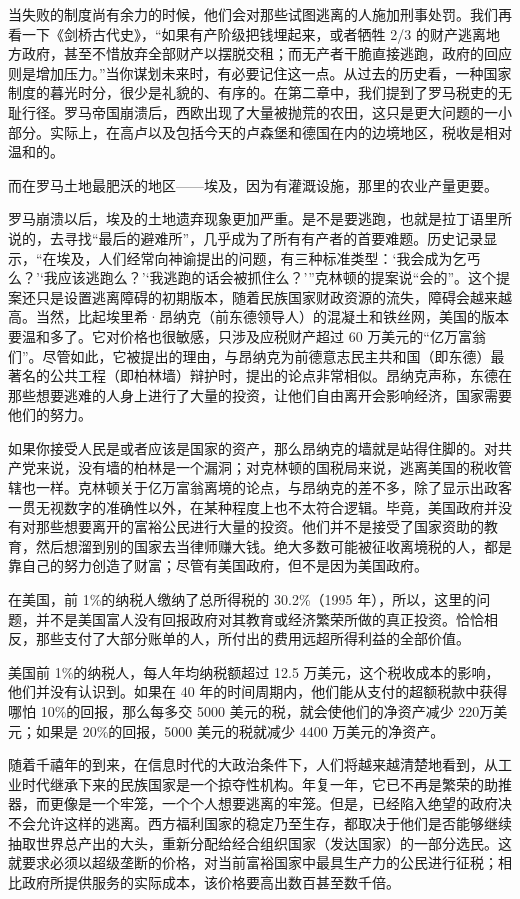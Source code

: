 当失败的制度尚有余力的时候，他们会对那些试图逃离的人施加刑事处罚。我们再看一下《剑桥古代史》，“如果有产阶级把钱埋起来，或者牺牲 2/3 的财产逃离地方政府，甚至不惜放弃全部财产以摆脱交租；而无产者干脆直接逃跑，政府的回应则是增加压力。”当你谋划未来时，有必要记住这一点。从过去的历史看，一种国家制度的暮光时分，很少是礼貌的、有序的。在第二章中，我们提到了罗马税吏的无耻行径。罗马帝国崩溃后，西欧出现了大量被抛荒的农田，这只是更大问题的一小部分。实际上，在高卢以及包括今天的卢森堡和德国在内的边境地区，税收是相对温和的。

而在罗马土地最肥沃的地区——埃及，因为有灌溉设施，那里的农业产量更要。

罗马崩溃以后，埃及的土地遗弃现象更加严重。是不是要逃跑，也就是拉丁语里所说的，去寻找“最后的避难所”，几乎成为了所有有产者的首要难题。历史记录显示，“在埃及，人们经常向神谕提出的问题，有三种标准类型：‘我会成为乞丐么？’‘我应该逃跑么？’‘我逃跑的话会被抓住么？’”克林顿的提案说“会的”。这个提案还只是设置逃离障碍的初期版本，随着民族国家财政资源的流失，障碍会越来越高。当然，比起埃里希·昂纳克（前东德领导人）的混凝土和铁丝网，美国的版本要温和多了。它对价格也很敏感，只涉及应税财产超过 60 万美元的“亿万富翁们”。尽管如此，它被提出的理由，与昂纳克为前德意志民主共和国（即东德）最著名的公共工程（即柏林墙）辩护时，提出的论点非常相似。昂纳克声称，东德在那些想要逃难的人身上进行了大量的投资，让他们自由离开会影响经济，国家需要他们的努力。

如果你接受人民是或者应该是国家的资产，那么昂纳克的墙就是站得住脚的。对共产党来说，没有墙的柏林是一个漏洞；对克林顿的国税局来说，逃离美国的税收管辖也一样。克林顿关于亿万富翁离境的论点，与昂纳克的差不多，除了显示出政客一贯无视数字的准确性以外，在某种程度上也不太符合逻辑。毕竟，美国政府并没有对那些想要离开的富裕公民进行大量的投资。他们并不是接受了国家资助的教育，然后想溜到别的国家去当律师赚大钱。绝大多数可能被征收离境税的人，都是靠自己的努力创造了财富；尽管有美国政府，但不是因为美国政府。

在美国，前 1\%的纳税人缴纳了总所得税的 30.2\%（1995 年），所以，这里的问题，并不是美国富人没有回报政府对其教育或经济繁荣所做的真正投资。恰恰相反，那些支付了大部分账单的人，所付出的费用远超所得利益的全部价值。

美国前 1\%的纳税人，每人年均纳税额超过 12.5 万美元，这个税收成本的影响，他们并没有认识到。如果在 40 年的时间周期内，他们能从支付的超额税款中获得哪怕 10\%的回报，那么每多交 5000 美元的税，就会使他们的净资产减少 220万美元；如果是 20\%的回报，5000 美元的税就减少 4400 万美元的净资产。

随着千禧年的到来，在信息时代的大政治条件下，人们将越来越清楚地看到，从工业时代继承下来的民族国家是一个掠夺性机构。年复一年，它已不再是繁荣的助推器，而更像是一个牢笼，一个个人想要逃离的牢笼。但是，已经陷入绝望的政府决不会允许这样的逃离。西方福利国家的稳定乃至生存，都取决于他们是否能够继续抽取世界总产出的大头，重新分配给经合组织国家（发达国家）的一部分选民。这就要求必须以超级垄断的价格，对当前富裕国家中最具生产力的公民进行征税；相比政府所提供服务的实际成本，该价格要高出数百甚至数千倍。

